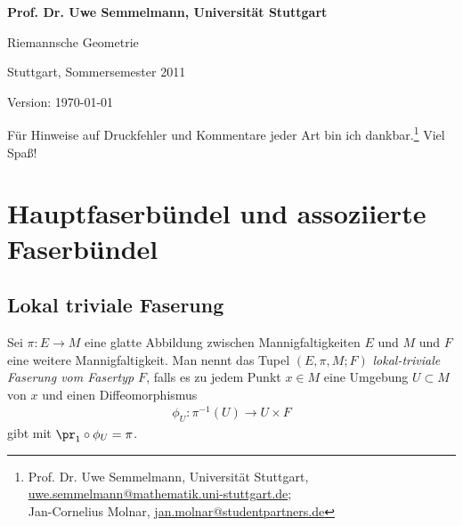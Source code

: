 \documentclass[%
	paper=a5,%
	fleqn,%
	DIV=18,%
	BCOR=0mm,
	fontsize=11pt,
	titlepage=false,%
	bibliography=totoc,
	DIV=18,%
	twoside=true,
	pdftitle=Riemannsche Geometrie,
	pdfauthor=Uwe Semmelmann,
	numbers=noendperiod]%
	{scrbook}
\begin{document}
\begin{titlepage}
\bfseries\color{darkgray}
\vspace*{2mm}
\noindent
Prof. Dr. Uwe Semmelmann, Universität Stuttgart

\begin{center}
\vspace*{10mm}
\noindent
{\huge\color{darkblue} Riemannsche Geometrie}

\vspace*{4mm}

Stuttgart, Sommersemester 2011
\end{center}

\vspace*{\fill}

\begin{flushright}
\small
Version: \today\
\vspace*{5mm}

Für Hinweise auf Druckfehler und Kommentare jeder Art bin ich 
dankbar.\footnote{\color{darkgray}
Prof. Dr. Uwe Semmelmann, Universität Stuttgart,
\href{mailto:uwe.semmelmann@mathematik.uni-stuttgart.de}{uwe.semmelmann@mathematik.uni-stuttgart.de};\\
Jan-Cornelius Molnar,
\href{mailto:jan.molnar@studentpartners.de}{jan.molnar@studentpartners.de}}
Viel Spaß!
\end{flushright}
\end{titlepage}


\tableofcontents


\chapter{Hauptfaserbündel und assoziierte Faserbündel}

\section{Lokal triviale Faserung}

\begin{defn}
Sei $\pi\colon E\to M$ eine glatte Abbildung zwischen Mannigfaltigkeiten $E$ und $M$
und $F$ eine weitere Mannigfaltigkeit. Man nennt das Tupel $(E,\pi,M;F)$
\emph{lokal-triviale Faserung vom Fasertyp $F$}, falls es zu jedem Punkt $x\in
M$ eine Umgebung $U\subset M$ von $x$ und einen Diffeomorphismus
\begin{align*}
\phi_U : \pi^{-1}(U)\to U\times F\tag{*}
\end{align*}
gibt mit $\pr_1\circ\phi_U = \pi$.\fish
\end{defn}
\end{document}
